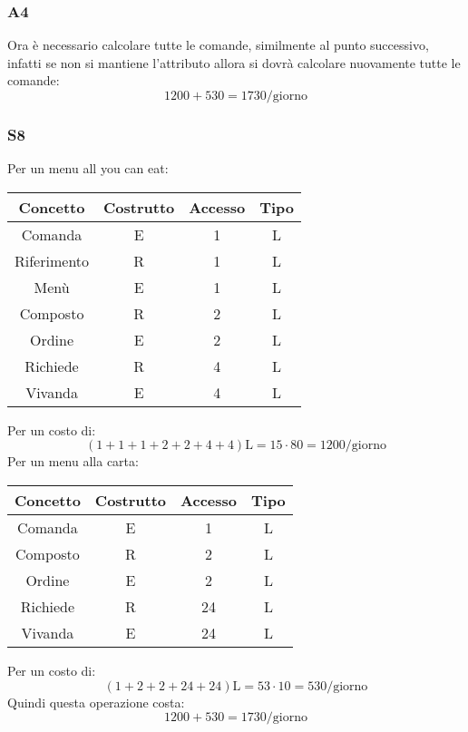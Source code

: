 \documentclass[a4paper,12pt]{report}
\begin{document}
\subsubsection{A4}
%
Ora è necessario calcolare tutte le comande, similmente al punto successivo, infatti se non si mantiene l'attributo allora si dovrà calcolare nuovamente tutte le comande: 
\begin{equation}
    1200 + 530 = 1730\text{/giorno}
\end{equation}
%
\subsubsection{S8}
%
Per un menu all you can eat:
\begin{table}[H]
    \centering
    \begin{tabular}{|| c | c | c | c ||}
        \hline
        Concetto & Costrutto & Accesso & Tipo\\
        \hline
        Comanda & E & 1 & L\\
        \hline
        Riferimento & R & 1 & L\\
        \hline
        Menù & E & 1 & L\\
        \hline
        Composto & R & 2 & L\\
        \hline
        Ordine & E & 2 & L\\
        \hline
        Richiede & R & 4 & L\\
        \hline
        Vivanda & E & 4 & L\\
        \hline
    \end{tabular}
\end{table}
%
Per un costo di:
\begin{equation}
    (1+1+1+2+2+4+4)\text{L}= 15\cdot 80 = 1200\text{/giorno}
\end{equation}
%
Per un menu alla carta:
\begin{table}[H]
    \centering
    \begin{tabular}{|| c | c | c | c ||}
        \hline
        Concetto & Costrutto & Accesso & Tipo\\
        \hline
        Comanda & E & 1 & L\\
        \hline
        Composto & R & 2 & L\\
        \hline
        Ordine & E & 2 & L\\
        \hline
        Richiede & R & 24 & L\\
        \hline
        Vivanda & E & 24 & L\\
        \hline
    \end{tabular}
\end{table}
%
Per un costo di:
\begin{equation}
    (1+2+2+24+24)\text{L} = 53 \cdot 10 = 530\text{/giorno}
\end{equation}
%
Quindi questa operazione costa:
\begin{equation}
    1200 + 530 = 1730 \text{/giorno}
\end{equation}
\end{document}
